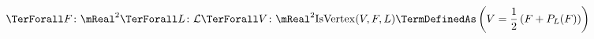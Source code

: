 

\hypertarget{def-parabola-vertex}{}
\begin{object}[ParabolaVertex]
\[
\TerForall F \colon \mReal^2
\TerForall L \colon \mathcal{L}
\TerForall V \colon \mReal^2
\mathrm{IsVertex}(V, F, L) \TermDefinedAs 
\left( V = \frac{1}{2} \left( F + P_L(F) \right) \right)
\]
\end{object}